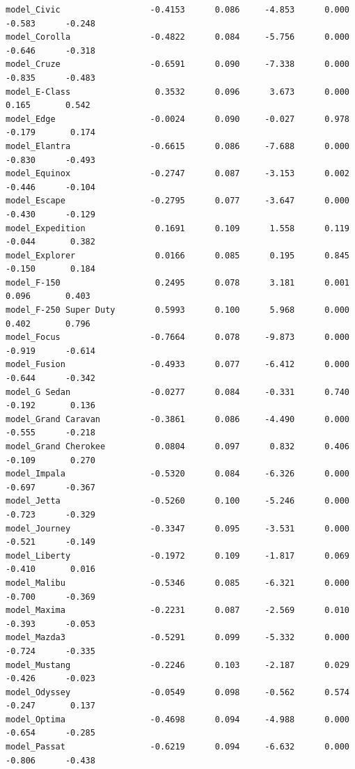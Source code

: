\documentclass[
  12pt]{article}
\begin{document}
\begin{verbatim}
model_Civic                  -0.4153      0.086     -4.853      0.000      -0.583      -0.248
model_Corolla                -0.4822      0.084     -5.756      0.000      -0.646      -0.318
model_Cruze                  -0.6591      0.090     -7.338      0.000      -0.835      -0.483
model_E-Class                 0.3532      0.096      3.673      0.000       0.165       0.542
model_Edge                   -0.0024      0.090     -0.027      0.978      -0.179       0.174
model_Elantra                -0.6615      0.086     -7.688      0.000      -0.830      -0.493
model_Equinox                -0.2747      0.087     -3.153      0.002      -0.446      -0.104
model_Escape                 -0.2795      0.077     -3.647      0.000      -0.430      -0.129
model_Expedition              0.1691      0.109      1.558      0.119      -0.044       0.382
model_Explorer                0.0166      0.085      0.195      0.845      -0.150       0.184
model_F-150                   0.2495      0.078      3.181      0.001       0.096       0.403
model_F-250 Super Duty        0.5993      0.100      5.968      0.000       0.402       0.796
model_Focus                  -0.7664      0.078     -9.873      0.000      -0.919      -0.614
model_Fusion                 -0.4933      0.077     -6.412      0.000      -0.644      -0.342
model_G Sedan                -0.0277      0.084     -0.331      0.740      -0.192       0.136
model_Grand Caravan          -0.3861      0.086     -4.490      0.000      -0.555      -0.218
model_Grand Cherokee          0.0804      0.097      0.832      0.406      -0.109       0.270
model_Impala                 -0.5320      0.084     -6.326      0.000      -0.697      -0.367
model_Jetta                  -0.5260      0.100     -5.246      0.000      -0.723      -0.329
model_Journey                -0.3347      0.095     -3.531      0.000      -0.521      -0.149
model_Liberty                -0.1972      0.109     -1.817      0.069      -0.410       0.016
model_Malibu                 -0.5346      0.085     -6.321      0.000      -0.700      -0.369
model_Maxima                 -0.2231      0.087     -2.569      0.010      -0.393      -0.053
model_Mazda3                 -0.5291      0.099     -5.332      0.000      -0.724      -0.335
model_Mustang                -0.2246      0.103     -2.187      0.029      -0.426      -0.023
model_Odyssey                -0.0549      0.098     -0.562      0.574      -0.247       0.137
model_Optima                 -0.4698      0.094     -4.988      0.000      -0.654      -0.285
model_Passat                 -0.6219      0.094     -6.632      0.000      -0.806      -0.438

\end{verbatim}
\end{document}
